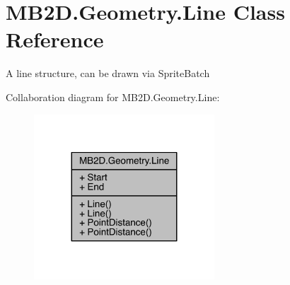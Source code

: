 \hypertarget{class_m_b2_d_1_1_geometry_1_1_line}{}\section{M\+B2\+D.\+Geometry.\+Line Class Reference}
\label{class_m_b2_d_1_1_geometry_1_1_line}


A line structure, can be drawn via Sprite\+Batch  




Collaboration diagram for M\+B2\+D.\+Geometry.\+Line\+:\nopagebreak
\begin{figure}[H]
\begin{center}
\leavevmode
\includegraphics[width=191pt]{class_m_b2_d_1_1_geometry_1_1_line__coll__graph}
\end{center}
\end{figure}
